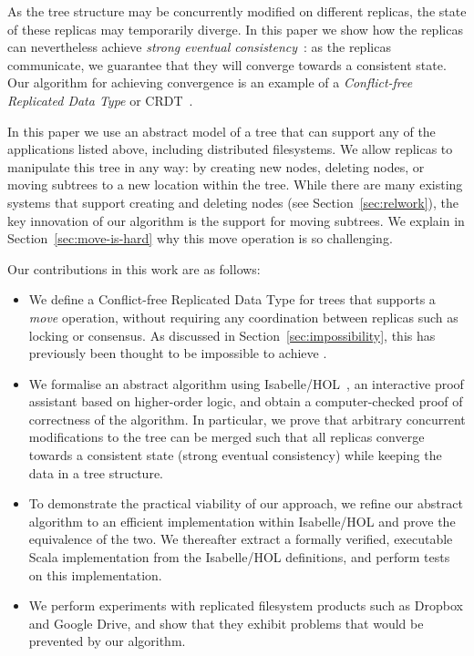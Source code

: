 \documentclass[sigconf]{acmart}
\begin{document}
As the tree structure may be concurrently modified on different replicas, the state of these replicas may temporarily diverge.
In this paper we show how the replicas can nevertheless achieve \emph{strong eventual consistency}~\cite{Shapiro:2011un,Gomes:2017gy}: as the replicas communicate, we guarantee that they will converge towards a consistent state.
Our algorithm for achieving convergence is an example of a \emph{Conflict-free Replicated Data Type} or CRDT~\cite{Shapiro:2011wy,Shapiro:2011un}.

In this paper we use an abstract model of a tree that can support any of the applications listed above, including distributed filesystems.
We allow replicas to manipulate this tree in any way: by creating new nodes, deleting nodes, or moving subtrees to a new location within the tree.
While there are many existing systems that support creating and deleting nodes (see Section~\ref{sec:relwork}), the key innovation of our algorithm is the support for moving subtrees.
We explain in Section~\ref{sec:move-is-hard} why this move operation is so challenging.

Our contributions in this work are as follows:
\begin{itemize}
    \item We define a Conflict-free Replicated Data Type for trees that supports a \emph{move} operation, without requiring any coordination between replicas such as locking or consensus.
        As discussed in Section~\ref{sec:impossibility}, this has previously been thought to be impossible to achieve \cite{Najafzadeh:2017vk,Najafzadeh:2018bw}.
    \item We formalise an abstract algorithm using Isabelle/HOL~\cite{DBLP:conf/tphol/WenzelPN08}, an interactive proof assistant based on higher-order logic, and obtain a computer-checked proof of correctness of the algorithm.
        In particular, we prove that arbitrary concurrent modifications to the tree can be merged such that all replicas converge towards a consistent state (strong eventual consistency) while keeping the data in a tree structure.
    \item To demonstrate the practical viability of our approach, we refine our abstract algorithm to an efficient implementation within Isabelle/HOL and prove the equivalence of the two.  We thereafter extract a formally verified, executable Scala implementation from the Isabelle/HOL definitions, and perform tests on this implementation.
    \item We perform experiments with replicated filesystem products such as Dropbox and Google Drive, and show that they exhibit problems that would be prevented by our algorithm.
\end{itemize}
\end{document}
